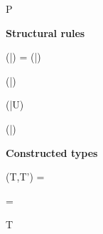 \begin{figure*}[htbp]
\begin{minipage}[t]{.3\textwidth}
\infrule
  { \bdb{\zeta} \extends P \extends \bd{\dontcare} \in \Delta }
  {  }

\infrule
  { \jsub{\alpha}{\Bottom}{\C} }
  {  }

\end{minipage}%
\begin{minipage}[t]{.4\textwidth}
\centering
\textbf{Structural rules}

\infrule
  {\countof(\bar{\alpha}) = \countof(\bar{\eta}) \andalso  \jbsub{\alpha}{\eta}{\C} \\[2pt]
    }
  {  }

\infrule
  {\countof(\bar{\alpha})  \andalso \quad \jbsub{\alpha}{\Bottom}{\C} }
  { \jsub{\tupleb{\alpha}}{\eta}{\bigvee\bigsetb{\C}} }

\infrule
  {  \andalso {} }
  {  }
  
\infrule
  { \countof(\bar{U})  }
  {  }
  
\infrule
  { \countof(\bar{\alpha})  }
  {  }

\infax
  {  }

\infax
  {  }

\end{minipage}

\bigskip

\begin{minipage}[t]{.667\textwidth}
\centering
\textbf{Constructed types}

\infrule
  { (T,T') \andalso
    \setb{\tau} =  \andalso
     }
  {  }

\infrule
  { \setb{\tau} =  \andalso
     }
  {  }

\infrule
  {  \; T \; \dontcare \;  \in \set{\Delta} \\[1pt]
      }
  {  }


\end{minipage}
\end{figure*}
